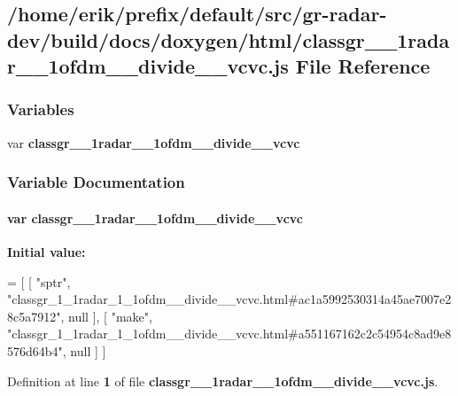 \subsection{/home/erik/prefix/default/src/gr-\/radar-\/dev/build/docs/doxygen/html/classgr\+\_\+\_\+1radar\+\_\+\_\+1ofdm\+\_\+\+\_\+divide\+\_\+\+\_\+vcvc.js File Reference}
\label{classgr__1__1radar__1__1ofdm____divide____vcvc_8js}
\subsubsection*{Variables}
\begin{DoxyCompactItemize}
\item 
var {\bf classgr\+\_\+\_\+1radar\+\_\+\_\+1ofdm\+\_\+\+\_\+divide\+\_\+\+\_\+vcvc}
\end{DoxyCompactItemize}


\subsubsection{Variable Documentation}
\paragraph[{classgr\+\_\+1\+\_\+1radar\+\_\+1\+\_\+1ofdm\+\_\+\+\_\+divide\+\_\+\+\_\+vcvc}]{\setlength{\rightskip}{0pt plus 5cm}var classgr\+\_\+\_\+1radar\+\_\+\_\+1ofdm\+\_\+\+\_\+divide\+\_\+\+\_\+vcvc}\label{classgr__1__1radar__1__1ofdm____divide____vcvc_8js_ab0325df5c899221ac0afe7ef319ad171}
{\bfseries Initial value\+:}
\begin{DoxyCode}
=
[
    [ \textcolor{stringliteral}{"sptr"}, \textcolor{stringliteral}{"classgr\_1\_1radar\_1\_1ofdm\_\_divide\_\_vcvc.html#ac1a5992530314a45ae7007e28c5a7912"}, null ],
    [ \textcolor{stringliteral}{"make"}, \textcolor{stringliteral}{"classgr\_1\_1radar\_1\_1ofdm\_\_divide\_\_vcvc.html#a551167162c2c54954c8ad9e8576d64b4"}, null ]
]
\end{DoxyCode}


Definition at line {\bf 1} of file {\bf classgr\+\_\+\_\+1radar\+\_\+\_\+1ofdm\+\_\+\+\_\+divide\+\_\+\+\_\+vcvc.\+js}.

